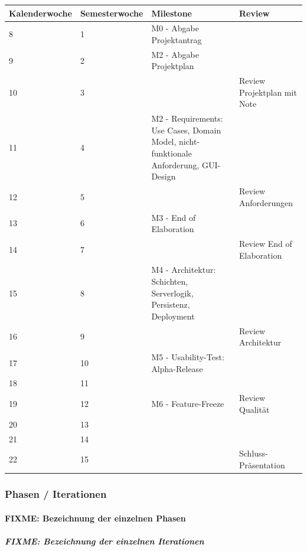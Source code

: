 \documentclass[a4paper]{article}
\begin{document}
\begin{tabular}{llp{12em}l}
\toprule
Kalenderwoche & Semesterwoche & Milestone & Review \\
\midrule
8 & 1 & M0 - Abgabe Projektantrag & \\
9 & 2 & M2 - Abgabe Projektplan & \\
10 & 3 & & Review Projektplan mit Note \\
11 & 4 & M2 - Requirements: Use Cases, Domain Model, nicht-funktionale Anforderung, GUI-Design & \\
12 & 5 & & Review Anforderungen \\
13 & 6 & M3 - End of Elaboration & \\
14 & 7 & & Review End of Elaboration \\
15 & 8 & M4 - Architektur: Schichten, Serverlogik, Persistenz, Deployment & \\
16 & 9 & & Review Architektur \\
17 & 10 & M5 - Usability-Test: Alpha-Release & \\
18 & 11 & & \\
19 & 12 & M6 - Feature-Freeze & Review Qualität \\
20 & 13 & & \\
21 & 14 & & \\
22 & 15 & & Schluss-Präsentation \\
\bottomrule
\end{tabular}


\subsubsection{Phasen / Iterationen}
\paragraph{FIXME: Bezeichnung der einzelnen Phasen}
\subparagraph{FIXME: Bezeichnung der einzelnen Iterationen}
\end{document}
